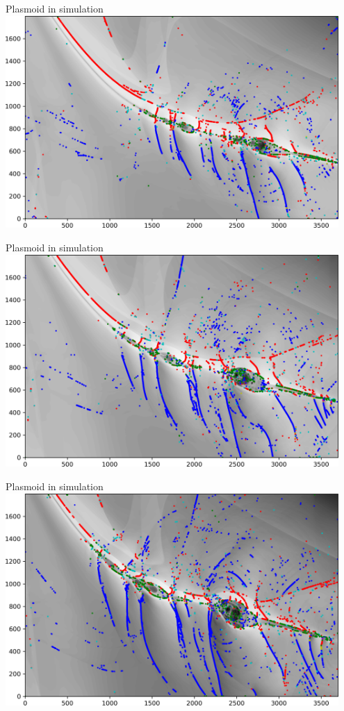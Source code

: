 \documentclass[10pt,aspectratio=169,usenames,dvipsnames]{beamer}
\begin{document}
\begin{frame}{Plasmoid in simulation}
\includegraphics[width=0.95\textwidth]{2023NAM/Figures/shocks66.png}
\end{frame}
\begin{frame}{Plasmoid in simulation}
\includegraphics[width=0.95\textwidth]{2023NAM/Figures/shocks67.png}
\end{frame}
\begin{frame}{Plasmoid in simulation}
\includegraphics[width=0.95\textwidth]{2023NAM/Figures/shocks68.png}
\end{frame}
\end{document}
